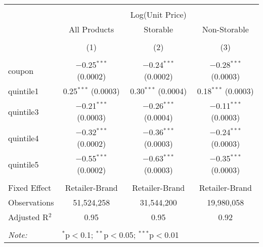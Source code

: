 
\begin{table}[!htbp] \centering 
  \caption{} 
  \label{tab:overallSavings} 
\begin{tabular}{@{\extracolsep{5pt}}lccc} 
\\[-1.8ex]\hline 
\hline \\[-1.8ex] 
 & \multicolumn{3}{c}{Log(Unit Price)} \\ 
\cline{2-4} 
 & All Products & Storable & Non-Storable \\ 
\\[-1.8ex] & (1) & (2) & (3)\\ 
\hline \\[-1.8ex] 
 coupon & $-$0.25$^{***}$ (0.0002) & $-$0.24$^{***}$ (0.0002) & $-$0.28$^{***}$ (0.0003) \\ 
  quintile1 & 0.25$^{***}$ (0.0003) & 0.30$^{***}$ (0.0004) & 0.18$^{***}$ (0.0003) \\ 
  quintile3 & $-$0.21$^{***}$ (0.0003) & $-$0.26$^{***}$ (0.0004) & $-$0.11$^{***}$ (0.0003) \\ 
  quintile4 & $-$0.32$^{***}$ (0.0002) & $-$0.36$^{***}$ (0.0003) & $-$0.24$^{***}$ (0.0003) \\ 
  quintile5 & $-$0.55$^{***}$ (0.0002) & $-$0.63$^{***}$ (0.0003) & $-$0.35$^{***}$ (0.0003) \\ 
 \hline \\[-1.8ex] 
Fixed Effect & Retailer-Brand & Retailer-Brand & Retailer-Brand \\ 
Observations & 51,524,258 & 31,544,200 & 19,980,058 \\ 
Adjusted R$^{2}$ & 0.95 & 0.95 & 0.92 \\ 
\hline 
\hline \\[-1.8ex] 
\textit{Note:}  & \multicolumn{3}{l}{$^{*}$p$<$0.1; $^{**}$p$<$0.05; $^{***}$p$<$0.01} \\ 
\end{tabular} 
\end{table} 
